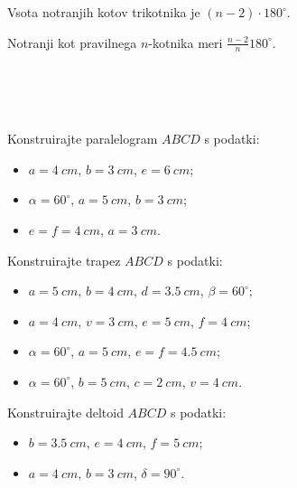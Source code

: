             \begin{izrek}
                Vsota notranjih kotov trikotnika je $(n-2)\cdot 180^\circ$.
            \end{izrek}

            
                Notranji kot pravilnega $n$-kotnika meri $\frac{n-2}{n} 180^\circ$.
            

        
~\\~\\~\\

        
            \begin{naloga}
                Konstruirajte paralelogram $ABCD$ s podatki:
                \begin{itemize}
                    \item $a=4~cm$, $b=3~cm$, $e=6~cm$;
                    \item $\alpha=60^\circ$, $a=5~cm$, $b=3~cm$;
                    \item $e=f=4~cm$, $a=3~cm$.
                \end{itemize}
            \end{naloga}

            \begin{naloga}
                Konstruirajte trapez $ABCD$ s podatki:
                \begin{itemize}
                    \item $a=5~cm$, $b=4~cm$, $d=3.5~cm$, $\beta=60^\circ$;
                    \item $a=4~cm$, $v=3~cm$, $e=5~cm$, $f=4~cm$;
                    \item $\alpha=60^\circ$, $a=5~cm$, $e=f=4.5~cm$;
                    \item $\alpha=60^\circ$, $b=5~cm$, $c=2~cm$, $v=4~cm$.
                \end{itemize}
            \end{naloga}

        


        
            \begin{naloga}
                Konstruirajte deltoid $ABCD$ s podatki:
                \begin{itemize}
                    \item $b=3.5~cm$, $e=4~cm$, $f=5~cm$;
                    \item $a=4~cm$, $b=3~cm$, $\delta=90^\circ$.
                \end{itemize}
            \end{naloga}

            \begin{naloga}
                
            \end{naloga}
        